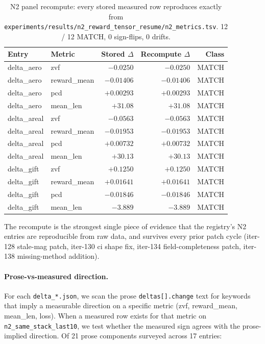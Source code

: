 \begin{table}[h]
\centering
\small
\begin{tabular}{llrrr}
\toprule
Entry & Metric & Stored $\Delta$ & Recompute $\Delta$ & Class \\
\midrule
delta\_aero  & zvf         & $-0.0250$  & $-0.0250$  & MATCH \\
delta\_aero  & reward\_mean & $-0.01406$ & $-0.01406$ & MATCH \\
delta\_aero  & pcd         & $+0.00293$  & $+0.00293$  & MATCH \\
delta\_aero  & mean\_len    & $+31.08$   & $+31.08$   & MATCH \\
delta\_areal & zvf         & $-0.0563$  & $-0.0563$  & MATCH \\
delta\_areal & reward\_mean & $-0.01953$ & $-0.01953$ & MATCH \\
delta\_areal & pcd         & $+0.00732$  & $+0.00732$  & MATCH \\
delta\_areal & mean\_len    & $+30.13$   & $+30.13$   & MATCH \\
delta\_gift  & zvf         & $+0.1250$  & $+0.1250$  & MATCH \\
delta\_gift  & reward\_mean & $+0.01641$ & $+0.01641$ & MATCH \\
delta\_gift  & pcd         & $-0.01846$ & $-0.01846$ & MATCH \\
delta\_gift  & mean\_len    & $-3.889$   & $-3.889$   & MATCH \\
\bottomrule
\end{tabular}
\caption{N2 panel recompute: every stored measured row reproduces
exactly from \texttt{experiments/results/n2\_reward\_tensor\_resume/n2\_metrics.tsv}.
12 / 12 MATCH, 0 sign-flips, 0 drifts.}
\label{tab:p6-iter150-recompute}
\end{table}

The recompute is the strongest single piece of evidence that the
registry's N2 entries are reproducible from raw data, and survives every
prior patch cycle (iter-128 stale-mag patch, iter-130 ci shape fix,
iter-134 field-completeness patch, iter-138 missing-method addition).

\paragraph{Prose-vs-measured direction.}
For each \texttt{delta\_*.json}, we scan the prose
\texttt{deltas[].change} text for keywords that imply a measurable
direction on a specific metric (zvf, reward\_mean, mean\_len, loss).
When a measured row exists for that metric on
\texttt{n2\_same\_stack\_last10}, we test whether the measured sign
agrees with the prose-implied direction. Of 21 prose components
surveyed across 17 entries:

